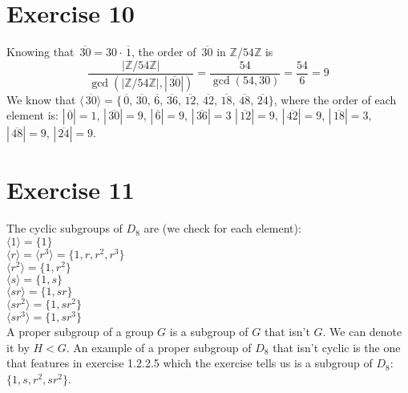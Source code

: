 \documentclass{article}
\newcommand{\Z}{\mathbb{Z}}
\newcommand{\olsi}[1]{\,\overline{\!{#1}}}
\begin{document}
    \section*{Exercise 10}
    Knowing that $\olsi{30} = 30 \cdot \olsi{1}$,
    the order of $\olsi{30}$ in $\Z/54\Z$ is
    \[ \dfrac{|\Z/54\Z|}{\gcd(|\Z/54\Z|, |\olsi{30}|)}
    = \dfrac{54}{\gcd(54, 30)} 
    = \dfrac{54}{6}
    = 9 \]
    We know that $\langle \olsi{30} \rangle
    = \{ \olsi{0}, \olsi{30}, \olsi{6}, \olsi{36}, \olsi{12}, 
    \olsi{42}, \olsi{18}, \olsi{48}, \olsi{24}\}$,
    where the order of each element is: $|\olsi{0}| = 1$,
    $|\olsi{30}| = 9$, $|\olsi{6}| = 9$, $|\olsi{36}| = 3$
    $|\olsi{12}| = 9$, $|\olsi{42}| = 9$, $|\olsi{18}| = 3$,
    $|\olsi{48}| = 9$, $|\olsi{24}| = 9$.


    \section*{Exercise 11}
    The cyclic subgroups of $D_8$ are (we check for each element): \\
    $\langle 1 \rangle = \{1\}$ \\
    $\langle r \rangle = \langle r^3 \rangle = \{1, r, r^2, r^3\}$ \\
    $\langle r^2 \rangle = \{1, r^2\}$ \\
    $\langle s \rangle = \{1, s\}$ \\
    $\langle sr \rangle = \{1, sr\}$ \\
    $\langle sr^2 \rangle = \{1, sr^2\}$ \\
    $\langle sr^3 \rangle = \{1, sr^3\}$ \\
    A proper subgroup of a group $G$ is a subgroup of $G$ that isn't $G$.
    We can denote it by $H < G$.
    An example of a proper subgroup of $D_8$
    that isn't cyclic is the one that features in exercise 1.2.2.5
    which the exercise tells us is a subgroup of $D_8$:
    $\{1, s, r^2, sr^2\}$.
\end{document}
